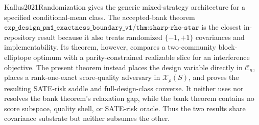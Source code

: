 Kallus2021Randomization gives the generic mixed-strategy architecture for a specified conditional-mean class. The accepted-bank theorem \(\texttt{exp\_design\_pm1\_exactness\_boundary\_v1/thm:sharp-rho-star}\) is the closest in-repository result because it also treats randomized \(\{-1,+1\}\) covariances and implementability. Its theorem, however, compares a two-community block-elliptope optimum with a parity-constrained realizable slice for an interference objective. The present theorem instead places the design variable directly in \(\mathcal C_n\), places a rank-one-exact score-quality adversary in \(\mathcal X_\rho(S)\), and proves the resulting SATE-risk saddle and full-design-class converse. It neither uses nor resolves the bank theorem's relaxation gap, while the bank theorem contains no score subspace, quality shell, or SATE-risk oracle. Thus the two results share covariance substrate but neither subsumes the other.